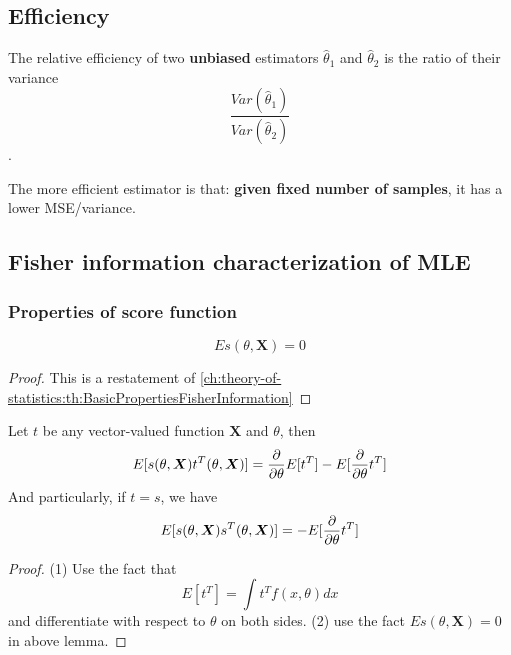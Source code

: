 \begin{refsection}
\subsection{Efficiency}





\begin{definition}
	The relative efficiency of two \textbf{unbiased} estimators $\hat{\theta}_1$ and $\hat{\theta}_2$ is the ratio of their variance $$\frac{Var(\hat{\theta}_1)}{Var(\hat{\theta}_2)}$$.
\end{definition}

\begin{remark}
	The more efficient estimator is that: \textbf{given fixed number of samples}, it has a lower MSE/variance. 
\end{remark}






\subsection{Fisher information characterization of MLE}

\subsubsection{Properties of score function}

\begin{lemma}
	$$Es(\theta,\bm{X}) = 0$$
\end{lemma}
\begin{proof}
	This is a restatement of \autoref{ch:theory-of-statistics:th:BasicPropertiesFisherInformation}
\end{proof}

\begin{lemma}\cite[550]{moon2000mathematical}
	Let $t$ be any vector-valued function $\bm{X}$ and $\theta$, then
	$$E[s(\theta,\bm{X})t^T(\theta,\bm{X})] = \frac{\partial}{\partial \theta} E[t^T] - E[\frac{\partial}{\partial \theta} t^T]$$ 
	And particularly, if $t = s$, we have
	$$E[s(\theta,\bm{X})s^T(\theta,\bm{X})] =  - E[\frac{\partial}{\partial \theta} t^T]$$ 	
\end{lemma}
\begin{proof}
	(1)	Use the fact that
	$$E[t^T] = \int t^T f(x,\theta) dx$$
	and differentiate with respect to $\theta$ on both sides.
	(2) use the fact $Es(\theta,\bm{X}) = 0$ in above lemma.
\end{proof}



\end{refsection}
